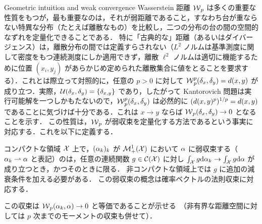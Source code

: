 \begin{rem2}{Geometric intuition and weak convergence}
Wasserstein 距離 $\operatorname{\mathcal{W}}_p$ は多くの重要な性質をもつが，最も重要なのは，それが弱距離であること，すなわち台が重ならない特異な分布（たとえば離散なもの）を比較し，二つの分布の台の間の空間的なずれを定量化できることである．
%
特に「古典的な」距離（あるいはダイバージェンス）は，離散分布の間では定義すらされない（$L^2$ ノルムは基準測度に関して密度をもつ連続測度にしか適用できず，離散 $\ell^2$ ノルムは適切に機能するために位置 $(x_i,y_j)$ があらかじめ定められた離散集合に値をとることを要求する）．これとは際立って対照的に，任意の $p> 0$ に対して $\operatorname{\mathcal{W}}_p^p(\delta_x,\delta_y) = d(x,y)$ が成り立つ．実際，$\mathcal{U}(\delta_x,\delta_y)=\{ \delta_{x,y}\}$ であり，したがって Kantorovich 問題は実行可能解を一つしかもたないので，$\operatorname{\mathcal{W}}_p^p(\delta_x,\delta_y)$ は必然的に $(d(x,y)^p)^{1/p}=d(x,y)$ であることに気づけば十分である．これは $x \rightarrow y$ ならば $\operatorname{\mathcal{W}}_p(\delta_x,\delta_y) \rightarrow 0$ となることを示す．
%
この性質は，$\operatorname{\mathcal{W}}_p$ が弱収束を定量化する方法であるという事実に対応する．これを以下に定義する．

\begin{defn}[弱収束]\label{dfn-weak-conv}
	コンパクトな領域 $\mathcal{X}$ 上で，$(\alpha_k)_k$ が $\mathcal{M}_+^1(\mathcal{X})$ において $\alpha$ に弱収束する（$\alpha_k \rightharpoonup \alpha$ と表記）のは，任意の連続関数 $g \in \mathcal{C}(\mathcal{X})$ に対し $\int_{\mathcal{X}} g \mathrm{d}\alpha_k \rightarrow \int_{\mathcal{X}} g \mathrm{d}\alpha$ が成り立つとき，かつそのときに限る．
	非コンパクトな領域上では $g$ に追加の減衰条件を加える必要がある．
	この弱収束の概念は確率ベクトルの法則収束に対応する．
\end{defn}

この収束は $\operatorname{\mathcal{W}}_p(\alpha_k,\alpha) \rightarrow 0$ と等価であることが示せる~\citep[Theorem 6.8]{Villani09}（非有界な距離空間に対しては $p$ 次までのモーメントの収束も併せて）．
\end{rem2}


